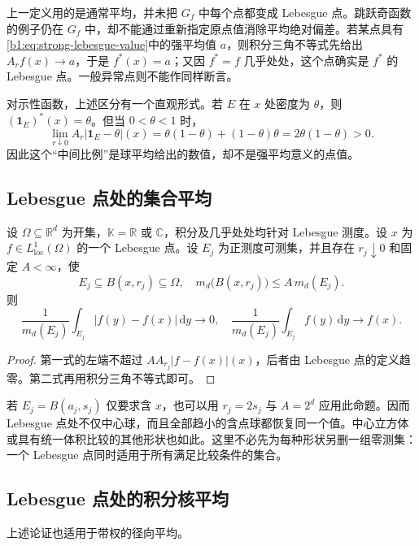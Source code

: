 上一定义用的是通常平均，并未把 \(G_f\) 中每个点都变成 Lebesgue 点。跳跃奇函数的例子仍在 \(G_f\) 中，却不能通过重新指定原点值消除平均绝对偏差。若某点具有\eqref{b1:eq:strong-lebesgue-value}中的强平均值 \(a\)，则积分三角不等式先给出 \(A_rf(x)\to a\)，于是 \(f^*(x)=a\)；又因 \(f^*=f\) 几乎处处，这个点确实是 \(f^*\) 的 Lebesgue 点。一般异常点则不能作同样断言。

\ProseParagraphBreak

对示性函数，上述区分有一个直观形式。若 \(E\) 在 \(x\) 处密度为 \(\theta\)，则 \((\mathbf1_E)^*(x)=\theta\)。但当 \(0<\theta<1\) 时，
\[
 \lim_{r\downarrow0}A_r|\mathbf1_E-\theta|(x)
 =\theta(1-\theta)+(1-\theta)\theta
 =2\theta(1-\theta)>0.
\]
因此这个“中间比例”是球平均给出的数值，却不是强平均意义的点值。

\subsection{Lebesgue 点处的集合平均}
\label{b1:subsec:140403}

\begin{proposition}\label{b1:prop:lebesgue-controlled-sets}
设 \(\Omega\subseteq\mathbb R^d\) 为开集，\(\mathbb K=\mathbb R\) 或 \(\mathbb C\)，积分及几乎处处均针对 Lebesgue 测度。设 \(x\) 为 \(f\in L^1_{\mathrm{loc}}(\Omega)\) 的一个 Lebesgue 点。设 \(E_j\) 为正测度可测集，并且存在 \(r_j\downarrow0\) 和固定 \(A<\infty\)，使
\[
 E_j\subseteq B(x,r_j)\subseteq\Omega,\quad
 m_d\bigl(B(x,r_j)\bigr)\leq A\,m_d(E_j).
\]
则
\[
 \frac1{m_d(E_j)}\int_{E_j}|f(y)-f(x)|\,\mathrm dy\longrightarrow0,
 \quad
 \frac1{m_d(E_j)}\int_{E_j}f(y)\,\mathrm dy\longrightarrow f(x).
\]
\end{proposition}
\begin{proof}
第一式的左端不超过 \(A A_{r_j}|f-f(x)|(x)\)，后者由 Lebesgue 点的定义趋零。第二式再用积分三角不等式即可。
\end{proof}

若 \(E_j=B(a_j,s_j)\) 仅要求含 \(x\)，也可以用 \(r_j=2s_j\) 与 \(A=2^d\) 应用此命题。因而 Lebesgue 点处不仅中心球，而且全部趋小的含点球都恢复同一个值。中心立方体或具有统一体积比较的其他形状也如此。这里不必先为每种形状另删一组零测集：一个 Lebesgue 点同时适用于所有满足比较条件的集合。

\subsection{Lebesgue 点处的积分核平均}
\label{b1:subsec:1404-kernel-averages}

上述论证也适用于带权的径向平均。

